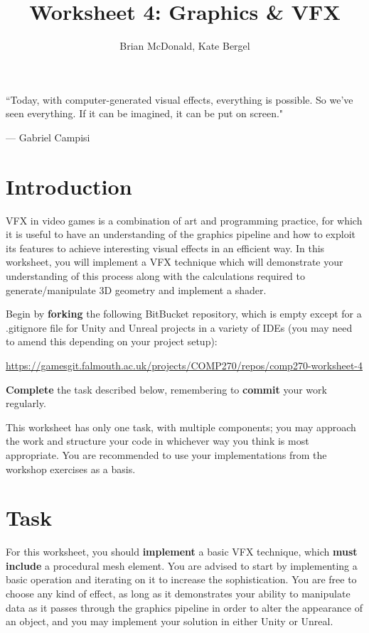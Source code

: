 \documentclass{../../../fal_assignment}
\title{Worksheet 4: Graphics \& VFX}
\author{Brian McDonald, Kate Bergel}
\begin{document}
\maketitle

\begin{marginquote}
``Today, with computer-generated visual effects, everything is possible. So we've seen everything. If it can be imagined, it can be put on screen."

\par --- Gabriel Campisi
\end{marginquote}
\section*{Introduction}

VFX in video games is a combination of art and programming practice, for which it is useful to have an understanding of the graphics pipeline and how to exploit its features to achieve interesting visual effects in an efficient way. In this worksheet, you will implement a VFX technique which will demonstrate your understanding of this process along with the calculations required to generate/manipulate 3D geometry and implement a shader.

Begin by \textbf{forking} the following BitBucket repository, which is empty except for a .gitignore file for Unity and Unreal projects in a variety of IDEs (you may need to amend this depending on your project setup):

\begin{center}
	\url{https://gamesgit.falmouth.ac.uk/projects/COMP270/repos/comp270-worksheet-4}
\end{center}

\textbf{Complete} the task described below, remembering to \textbf{commit} your work regularly.

This worksheet has only one task, with multiple components; you may approach the work and structure your code in whichever way you think is most appropriate. You are recommended to use your implementations from the workshop exercises as a basis.

\section*{Task}
For this worksheet, you should \textbf{implement} a basic VFX technique, which \textbf{must include} a procedural mesh element. You are advised to start by implementing a basic operation and iterating on it to increase the sophistication. You are free to choose any kind of effect, as long as it demonstrates your ability to manipulate data as it passes through the graphics pipeline in order to alter the appearance of an object, and you may implement your solution in either Unity or Unreal.
\end{document}

